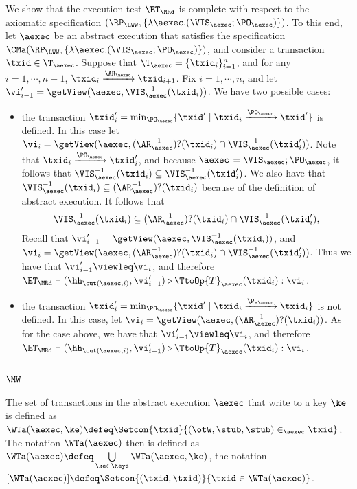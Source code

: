 We show that the execution test $\ET_{\MRd}$ is complete 
with respect to the axiomatic specification $(\RP_{\LWW}, \{\lambda \aexec.(\VIS_{\aexec};\PO_{\aexec})\})$. 
To this end, let $\aexec$ be an abstract execution that satisfies the specification
$\CMa(\RP_{\LWW}, \{\lambda \aexec.(\VIS_{\aexec};\PO_{\aexec})\})$, 
and consider a transaction $\txid \in \T_{\aexec}$. 
Suppose that $\T_{\aexec} = \{\txid_{i}\}_{i=1}^{n}$, and for any $i=1,\cdots, n-1$,
$\txid_{i} \xrightarrow{\AR_{\aexec}} \txid_{i+1}$.
Fix $i=1,\cdots,n$, and let $\vi'_{i-1} = \getView(\aexec, \VIS^{-1}_{\aexec}(\txid_{i}))$.
We have two possible cases: 
\begin{itemize}
\item the transaction $\txid'_{i} = \min_{\PO_{\aexec}}\{\txid' \mid \txid_{i} \xrightarrow{\PO_{\aexec}} \txid'\}$ is 
defined. In this case let $\vi_{i} =\getView(\aexec, (\AR^{-1}_{\aexec})?(\txid_{i}) \cap \VIS^{-1}_{\aexec}(\txid'_{i}))$. 
Note that $\txid_{i} \xrightarrow{\PO_{\aexec}} \txid'_{i}$, and because $\aexec \models \VIS_{\aexec} ; \PO_{\aexec}$, 
it follows that $\VIS^{-1}_{\aexec}(\txid_{i}) \subseteq \VIS^{-1}_{\aexec}(\txid'_{i})$. 
We also have that $\VIS^{-1}_{\aexec}(\txid_{i}) \subseteq (\AR^{-1}_{\aexec})?(\txid_{i})$ because of 
the definition of abstract execution. It follows that 
\[
\VIS^{-1}_{\aexec}(\txid_{i}) \subseteq (\AR^{-1}_{\aexec})?(\txid_{i}) \cap \VIS^{-1}_{\aexec}(\txid'_{i}),
\]
Recall that  $\vi'_{i-1} = \getView(\aexec, \VIS^{-1}_{\aexec}(\txid_{i}))$, 
and $\vi_{i} =\getView(\aexec, (\AR^{-1}_{\aexec})?(\txid_{i}) \cap \VIS^{-1}_{\aexec}(\txid'_{i}))$. 
Thus we have that $\vi'_{i-1} \viewleq \vi_{i}$, and therefore $\ET_{\MRd} \vdash (\hh_{\cut(\aexec, i)}, \vi'_{i-1}) 
\triangleright \TtoOp{T}_{\aexec}(\txid_{i}) : \vi_{i}$. 
\item the transaction $\txid'_{i} = \min_{\PO_{\aexec}}\{\txid' \mid \txid_{i} \xrightarrow{\PO_{\aexec}} \txid_{i}\}$ 
is not defined. In this case, let $\vi_{i} = \getView(\aexec, (\AR^{-1}_{\aexec})?(\txid_{i}))$. 
As for the case above, we have that $\vi'_{i-1} \viewleq \vi_{i}$, and therefore 
$\ET_{\MRd} \vdash (\hh_{\cut(\aexec, i)}, \vi'_{i-1}) \triangleright \TtoOp{T}_{\aexec}(\txid_{i}) : \vi_{i}$. 
\end{itemize}

\subsection{\( \MW \)}

The set of transactions in the abstract execution \( \aexec \)  that write to a key \( \ke \) is defined as \( \WTa(\aexec, \ke) \defeq \Setcon{\txid}{(\otW, \stub, \stub) \in_\aexec \txid} \).
The notation \( \WTa(\aexec) \) then is defined as \( \WTa(\aexec) \defeq \bigcup\limits_{\ke \in \Keys}  \WTa(\aexec, \ke)\),
the notation \( [\WTa(\aexec)] \defeq \Setcon{(\txid, \txid)}{\txid \in \WTa(\aexec)}\).

